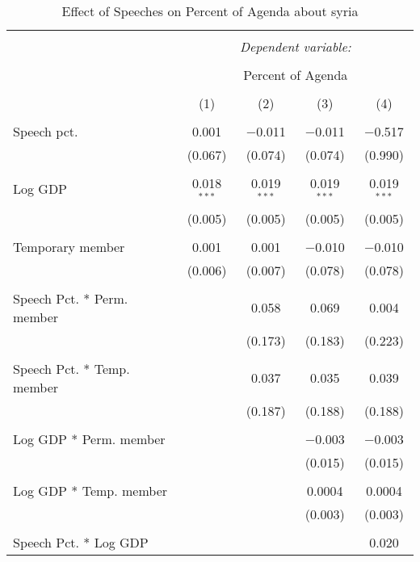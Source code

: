 
\begin{table}[!htbp] \centering 
  \caption{Effect of Speeches on Percent of Agenda about  syria} 
  \label{} 
\begin{tabular}{@{\extracolsep{5pt}}lcccc} 
\\[-1.8ex]\hline 
\hline \\[-1.8ex] 
 & \multicolumn{4}{c}{\textit{Dependent variable:}} \\ 
\cline{2-5} 
\\[-1.8ex] & \multicolumn{4}{c}{Percent of Agenda} \\ 
\\[-1.8ex] & (1) & (2) & (3) & (4)\\ 
\hline \\[-1.8ex] 
 Speech pct. & 0.001 & $-$0.011 & $-$0.011 & $-$0.517 \\ 
  & (0.067) & (0.074) & (0.074) & (0.990) \\ 
  & & & & \\ 
 Log GDP & 0.018$^{***}$ & 0.019$^{***}$ & 0.019$^{***}$ & 0.019$^{***}$ \\ 
  & (0.005) & (0.005) & (0.005) & (0.005) \\ 
  & & & & \\ 
 Temporary member & 0.001 & 0.001 & $-$0.010 & $-$0.010 \\ 
  & (0.006) & (0.007) & (0.078) & (0.078) \\ 
  & & & & \\ 
 Speech Pct. * Perm. member &  & 0.058 & 0.069 & 0.004 \\ 
  &  & (0.173) & (0.183) & (0.223) \\ 
  & & & & \\ 
 Speech Pct. * Temp. member &  & 0.037 & 0.035 & 0.039 \\ 
  &  & (0.187) & (0.188) & (0.188) \\ 
  & & & & \\ 
 Log GDP * Perm. member &  &  & $-$0.003 & $-$0.003 \\ 
  &  &  & (0.015) & (0.015) \\ 
  & & & & \\ 
 Log GDP * Temp. member &  &  & 0.0004 & 0.0004 \\ 
  &  &  & (0.003) & (0.003) \\ 
  & & & & \\ 
 Speech Pct. * Log GDP &  &  &  & 0.020 \\ 

\end{tabular}
\end{table}
